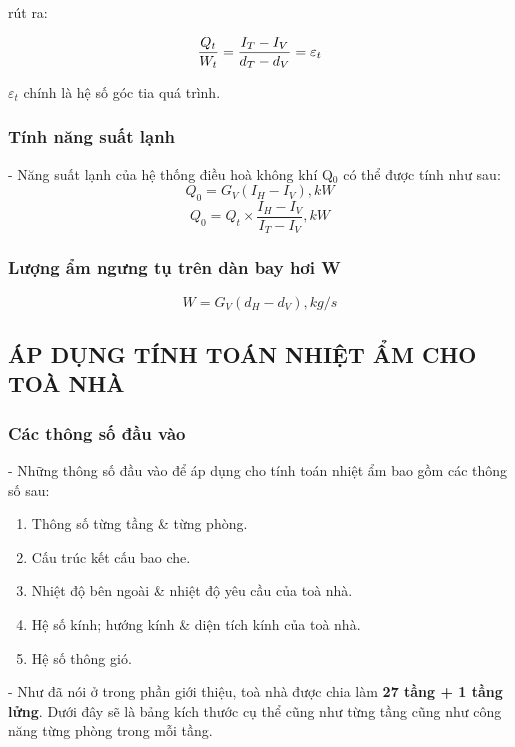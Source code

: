rút ra:

\begin{equation}
	 \dfrac{Q_{t}}{W_{t}}  =  \dfrac{I_{T} - I_{V}}{d_{T} - d_{V}}  = {\LARGE \varepsilon_{t}}
\end{equation}

{\Large $\varepsilon_{t}$} chính là hệ số góc tia quá trình.

\subsubsection{Tính năng suất lạnh}
- Năng suất lạnh của hệ thống điều hoà không khí Q$ _{0} $ có thể được tính như sau:
\begin{equation}
	Q _{0} = G_{V}(I_{H} - I_{V}), \textit{kW}
\end{equation}
\begin{equation}
	 Q _{0} = Q_{t}\times\dfrac{I_{H} - I_{V}}{I_{T} - I_{V}}, \textit{kW}
\end{equation}


\subsubsection{Lượng ẩm ngưng tụ trên dàn bay hơi W}
\begin{equation}
	W = G_{V}(d_{H}-d_{V}), \textit{kg/s}
\end{equation}

\subsection{ÁP DỤNG TÍNH TOÁN NHIỆT ẨM CHO TOÀ NHÀ}
\subsubsection{Các thông số đầu vào}
- Những thông số đầu vào để áp dụng cho tính toán nhiệt ẩm bao gồm các thông số sau:

\begin{enumerate}[leftmargin=2.2cm]
	\item Thông số từng tầng \& từng phòng.
	\item Cấu trúc kết cấu bao che.
	\item Nhiệt độ bên ngoài \& nhiệt độ yêu cầu của toà nhà.
	\item Hệ số kính; hướng kính \& diện tích kính của toà nhà.
	\item Hệ số thông gió.
\end{enumerate}

- Như đã nói ở trong phần giới thiệu, toà nhà được chia làm \textbf{27 tầng + 1 tầng lửng}. Dưới đây sẽ là bảng kích thước cụ thể cũng như từng tầng cũng như công năng từng phòng trong mỗi tầng.


